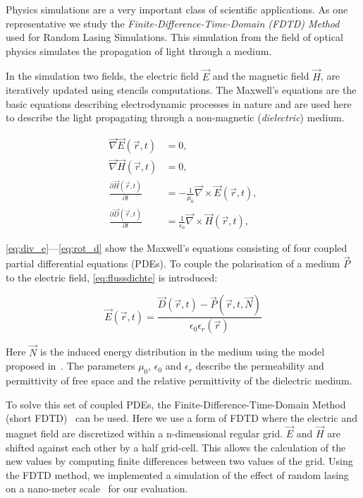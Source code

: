 Physics simulations are a very important class of scientific applications.
As one representative we study the \emph{Finite-Difference-Time-Domain (FDTD) Method} used for Random Lasing Simulations.
This simulation from the field of optical physics simulates the propagation of light through a medium.

In the simulation two fields, the electric field $\vec{E}$ and the magnetic field $\vec{H}$, are iteratively updated using stencils computations.
The Maxwell's equations are the basic equations describing electrodynamic processes in nature and are used here to describe the light propagating through a non-magnetic (\emph{dielectric}) medium.

\begin{align}
  \vec{\nabla}\vec{E}\left(\vec{r}, t\right) &= 0, \label{eq:div_e}\\
  \vec{\nabla}\vec{H}\left(\vec{r}, t\right) &= 0, \label{eq:div_h}\\
  \frac{\partial\vec{H}\left(\vec{r}, t\right)}{\partial t} &= -\frac{1}{\mu_0}\vec{\nabla} \times \vec{E}\left(\vec{r}, t\right), \label{eq:rot_h}\\
  \frac{\partial\vec{D}\left(\vec{r}, t\right)}{\partial t} &= \frac{1}{\epsilon_0}\vec{\nabla} \times \vec{H}\left(\vec{r}, t\right), \label{eq:rot_d}
\end{align}

\noindent
\autoref{eq:div_e}---\ref{eq:rot_d} show the Maxwell's equations consisting of four coupled partial differential equations (PDEs).
To couple the polarisation of a medium $\vec{P}$ to the electric field, \autoref{eq:flussdichte} is introduced:

\begin{equation}
\vec{E}\left(\vec{r}, t\right) = \frac{\vec{D}\left(\vec{r}, t\right) - \vec{P}\left(\vec{r}, t, \vec{N}\right)}{\epsilon_0\epsilon_r\left(\vec{r}\right)}
\label{eq:flussdichte}
\end{equation}

\noindent
Here $\vec{N}$ is the induced energy distribution in the medium using the model proposed in~\cite{Jiang2000}.
The parameters $\mu_0$, $\epsilon_0$ and $\epsilon_r$ describe the permeability and permittivity of free space and the relative permittivity of the dielectric medium.

To solve this set of coupled PDEs, the Finite-Difference-Time-Domain Method (short FDTD)~\cite{Yee1966} can be used.
Here we use a form of FDTD where the electric and magnet field are discretized within a n-dimensional regular grid.
$\vec{E}$ and $\vec{H}$ are shifted against each other by a half grid-cell.
This allows the calculation of the new values by computing finite differences between two values of the grid.
Using the FDTD method, we implemented a simulation of the effect of random lasing on a nano-meter scale~\cite{Cao1999} for our evaluation.

